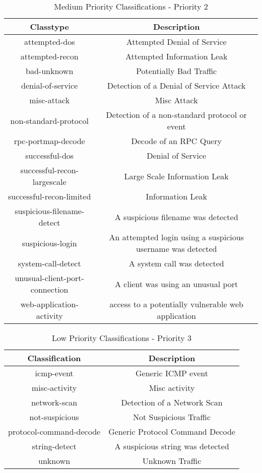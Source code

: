 \documentclass[english]{report}
\begin{document}
%
\begin{table}[!hbpt]

\caption{Medium Priority Classifications - Priority 2\label{Snort Medium Classifications}}

\begin{tabular}{|c|c|}
\hline 
Classtype&
Description\\
\hline
\hline 
attempted-dos&
Attempted Denial of Service\\
\hline 
attempted-recon&
Attempted Information Leak\\
\hline 
bad-unknown&
Potentially Bad Traffic\\
\hline 
denial-of-service&
Detection of a Denial of Service Attack\\
\hline 
misc-attack&
Misc Attack\\
\hline 
non-standard-protocol&
Detection of a non-standard protocol or event\\
\hline 
rpc-portmap-decode&
Decode of an RPC Query\\
\hline 
successful-dos&
Denial of Service\\
\hline 
successful-recon-largescale&
Large Scale Information Leak\\
\hline 
successful-recon-limited&
Information Leak\\
\hline 
suspicious-filename-detect&
A suspicious filename was detected\\
\hline 
suspicious-login&
An attempted login using a suspicious username was detected\\
\hline 
system-call-detect&
A system call was detected\\
\hline 
unusual-client-port-connection&
A client was using an unusual port\\
\hline 
web-application-activity&
access to a potentially vulnerable web application\\
\hline
\end{tabular}
\end{table}
%
\begin{table}[!hbpt]

\caption{Low Priority Classifications - Priority 3 \label{Snort Low Classifications}}

\begin{center}\begin{tabular}{|c|c|}
\hline 
Classification&
Description\\
\hline
\hline 
icmp-event&
Generic ICMP event\\
\hline 
misc-activity&
Misc activity\\
\hline 
network-scan&
Detection of a Network Scan\\
\hline 
not-suspicious&
Not Suspicious Traffic\\
\hline 
protocol-command-decode&
Generic Protocol Command Decode\\
\hline 
string-detect&
A suspicious string was detected\\
\hline 
unknown&
Unknown Traffic\\
\hline
\end{tabular}\end{center}
\end{table}
\end{document}
